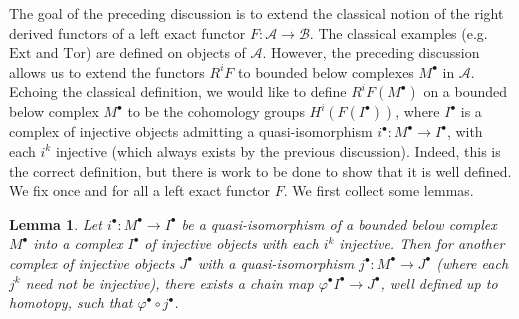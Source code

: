 \documentclass[psamsfonts, 12pt]{amsart}
\newtheorem{lem}[thm]{Lemma}
\theoremstyle{definition}
\theoremstyle{remark}
\begin{document}
The goal of the preceding discussion is to extend the classical notion of
the right derived functors of a left exact functor $F: \mathcal{A} \to \mathcal{B}$.
The classical examples (e.g. $\mathrm{Ext}$ and $\mathrm{Tor}$) are defined
on objects of $\mathcal{A}$. However, the preceding discussion allows us
to extend the functors $R^iF$ to bounded below complexes $M^\bullet$ in $\mathcal{A}$.
Echoing the classical definition, we would like to define $R^iF(M^\bullet)$ on
a bounded below complex $M^\bullet$ to be the cohomology groups $H^i(F(I^\bullet))$,
where $I^\bullet$ is a complex of injective objects admitting a quasi-isomorphism
$i^\bullet : M^\bullet \to I^\bullet$, with each $i^k$ injective (which always exists
by the previous discussion). Indeed, this is the correct definition, but there is work
to be done to show that it is well defined. We fix once and for all a left
exact functor $F$. We first collect some lemmas.
%
\begin{lem}
Let $i^\bullet : M^\bullet \to I^\bullet$
be a quasi-isomorphism of a bounded below complex $M^\bullet$ into a complex $I^\bullet$
of injective objects with each $i^k$ injective. Then for another complex
of injective objects $J^\bullet$ with a quasi-isomorphism
$j^\bullet : M^\bullet \to J^\bullet$ (where each $j^k$ need not be injective),
there exists a chain map $\varphi^\bullet I^\bullet \to J^\bullet$, well defined
up to homotopy, such that $\varphi^\bullet \circ j^\bullet$.
\end{lem}
%
\end{document}

